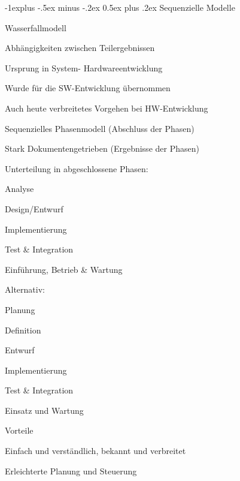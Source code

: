 \documentclass[a4paper]{article}
\makeatletter
\renewcommand{\subsection}{\@startsection{subsection}{2}{0mm}%
                                {-1explus -.5ex minus -.2ex}%
                                {0.5ex plus .2ex}%
                                {\normalfont\normalsize\bfseries}}
\makeatother
\begin{document}
\begin{multicols}{3}
  \subsection{Sequenzielle Modelle}
  \begin{itemize*}
    \item Wasserfallmodell
    \begin{itemize*}
      \item Abhängigkeiten zwischen Teilergebnissen
      \item Ursprung in System- Hardwareentwicklung
      \begin{itemize*}
        \item Wurde für die SW-Entwicklung übernommen
        \item Auch heute verbreitetes Vorgehen bei HW-Entwicklung
      \end{itemize*}
      \item Sequenzielles Phasenmodell (Abschluss der Phasen)
      \item Stark Dokumentengetrieben (Ergebnisse der Phasen)
      \item Unterteilung in abgeschlossene Phasen:
      \begin{itemize*}
        \item Analyse
        \item Design/Entwurf
        \item Implementierung
        \item Test \& Integration
        \item Einführung, Betrieb \& Wartung
      \end{itemize*}
      \item Alternativ:
      \begin{itemize*}
        \item Planung
        \item Definition
        \item Entwurf
        \item Implementierung
        \item Test \& Integration
        \item Einsatz und Wartung
      \end{itemize*}
      \item Vorteile
      \begin{itemize*}
        \item Einfach und verständlich, bekannt und verbreitet
        \item Erleichterte Planung und Steuerung
      \end{itemize*}

\end{itemize*}
\end{itemize*}
\end{multicols}
\end{document}
